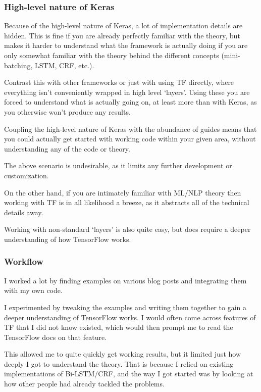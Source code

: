 \subsubsection*{High-level nature of Keras}

Because of the high-level nature of Keras, a lot of implementation details are
hidden. This is fine if you are already perfectly familiar with the theory, but
makes it harder to understand what the framework is actually doing if you are
only somewhat familiar with the theory behind the different concepts
(mini-batching, LSTM, CRF, etc.).

Contrast this with other frameworks or just with using TF directly, where
everything isn't conveniently wrapped in high level `layers'. Using these you are
forced to understand what is actually going on, at least more than with Keras,
as you otherwise won't produce any results.

Coupling the high-level nature of Keras with the abundance of guides means that
you could actually get started with working code within your given area, without
understanding any of the code or theory.

The above scenario is undesirable, as it limits any further development or
customization.

On the other hand, if you are intimately familiar with ML/NLP theory then
working with TF is in all likelihood a breeze, as it abstracts all of the
technical details away.

Working with non-standard `layers' is also quite easy, but does require a
deeper understanding of how TensorFlow works.

\subsubsection*{Workflow}

I worked a lot by finding examples on various blog posts and integrating them
with my own code.

I experimented by tweaking the examples and writing them together to
gain a deeper understanding of TensorFlow works. I would often come across
features of TF that I did not know existed, which would then prompt me to read
the TensorFlow docs on that feature.

This allowed me to quite quickly get working results, but it limited just how
deeply I got to understand the theory. That is because I relied on existing
implementations of Bi-LSTM/CRF, and the way I got started was by looking at how
other people had already tackled the problems.

